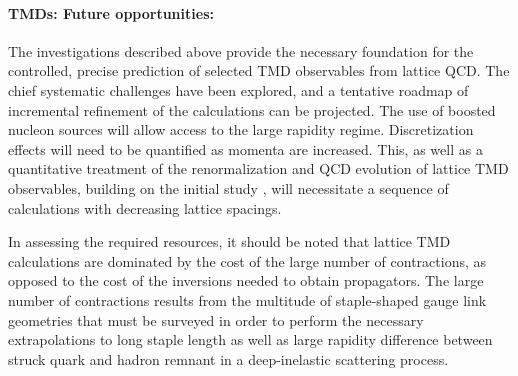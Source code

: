 \paragraph{TMDs: Future opportunities:}

The investigations described above provide the necessary foundation for
the controlled, precise prediction of selected TMD observables from
lattice QCD. The chief systematic challenges have been explored,
and a tentative roadmap of incremental refinement of the calculations can
be projected. The use of boosted nucleon sources will allow access to the large
rapidity regime. Discretization effects will need to be quantified
as momenta are increased. This, as well as a quantitative treatment
of the renormalization and QCD evolution of lattice TMD observables,
building on the initial study \cite{Yoon:2017qzo}, will necessitate a
sequence of calculations with decreasing lattice spacings.

In assessing the required resources, it should be noted that lattice
TMD calculations are dominated by the cost of the large number of
contractions, as opposed to the cost of the inversions needed to
obtain propagators. The large number of contractions results from the multitude of
staple-shaped gauge link geometries that must be surveyed in order
to perform the necessary extrapolations to long staple length as
well as large rapidity difference between struck quark and hadron
remnant in a deep-inelastic scattering process. 


